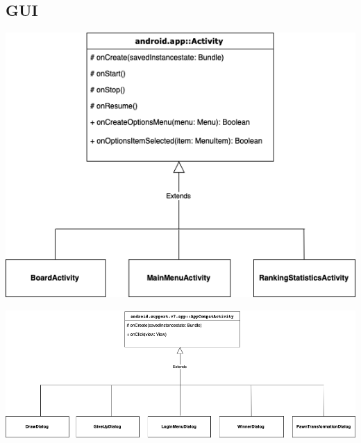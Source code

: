 \documentclass[parskip=full]{scrartcl}
\begin{document}
		\subsection{GUI}
		\begin{minipage}{\linewidth}
			\centering
			\includegraphics[width=1\linewidth]{Diagramme/ActivityDiagram}
			\label{fig:activities}
		\end{minipage}
	
	
		\begin{minipage}{\linewidth}
			\centering
			\includegraphics[width=1\linewidth]{Diagramme/DialogDiagram}
			\label{fig:dialoge}
		\end{minipage}
		\newpage
\end{document}
